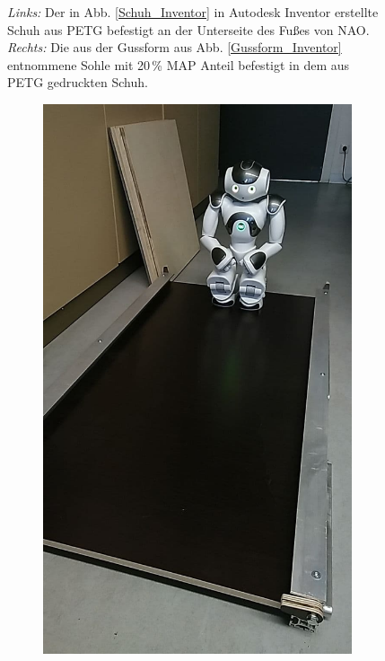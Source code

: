 \begin{figure}[tb]
\begin{subfigure}[c]{0.622\linewidth}
	\end{subfigure}
	\hfill
	\caption{\textit{Links:} Der in Abb. \ref{Schuh_Inventor} in Autodesk Inventor erstellte Schuh aus PETG befestigt an der Unterseite des Fußes von NAO. \textit{Rechts:} Die aus der Gussform aus Abb. \ref{Gussform_Inventor} entnommene Sohle mit 20\,\% MAP Anteil befestigt in dem aus PETG gedruckten Schuh.}
	\label{nao_mit_schuhen}
\end{figure}

\begin{figure}[tb]
	\hfill
	\begin{subfigure}[c]{0.4\linewidth}
		\centering
		\includegraphics[width=\linewidth]{Bilder/NAO_auf_Rampe2.jpg}

\end{subfigure}
\end{figure}
